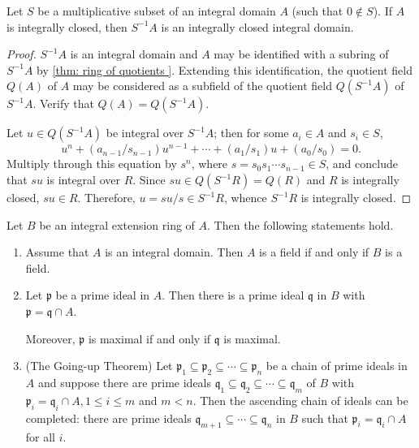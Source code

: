 \documentclass[12pt, oneside]{book}
\begin{document}
\begin{theorem}
    Let $S$ be a multiplicative subset of an integral domain $A$ (such that $0 \notin S$).
    If $A$ is integrally closed, then $S^{-1} A$ is an integrally closed integral domain.
    \begin{proof}
        $S^{-1} A$ is an integral domain and $A$ may be identified with a subring of $S^{-1} A$ by \ref{thm: ring of quotients }.
        Extending this identification, the quotient field $Q(A)$ of $A$ may be considered as a subfield of the quotient field $Q\left(S^{-1} A\right)$ of $S^{-1} A$. Verify that $Q(A)=Q\left(S^{-1} A\right)$.

        Let $u \in Q\left(S^{-1} A\right)$ be integral over $S^{-1} A$; then for some $a_i \in A$ and $s_i \in S$,
        \begin{equation*}
            u^n+\left(a_{n-1} / s_{n-1}\right) u^{n-1}+\cdots+\left(a_1 / s_1\right) u+\left(a_0 / s_0\right)=0 .
        \end{equation*}
        Multiply through this equation by $s^n$, where $s=s_0 s_1 \cdots s_{n-1} \in S$, and conclude that $su$ is integral over $R$. Since $s u \in Q\left(S^{-1} R\right)=Q(R)$ and $R$ is integrally closed, $s u \in R$. Therefore, $u=s u / s \in S^{-1} R$, whence $S^{-1} R$ is integrally closed.
    \end{proof}
\end{theorem}



\begin{theorem}
    Let $B$ be an integral extension ring of $A$. Then the following statements hold.
    \begin{enumerate}
        \item
              Assume that $A$ is an integral domain. Then $A$ is a field if and only if $B$ is a field.
        \item
              Let $\mathfrak{p}$ be a prime ideal in $A$. Then there is a prime ideal $\mathfrak{q}$ in $B$ with $\mathfrak{p}=\mathfrak{q} \cap A$.

              Moreover, $\mathfrak{p}$ is maximal if and only if $\mathfrak{q}$ is maximal.
        \item
              (The Going-up Theorem)
              Let $\mathfrak{p}_1 \subseteq \mathfrak{p}_2 \subseteq \cdots \subseteq \mathfrak{p}_n$ be a chain of prime ideals in $A$ and suppose there are prime ideals $\mathfrak{q}_1 \subseteq \mathfrak{q}_2 \subseteq \cdots \subseteq \mathfrak{q}_m$ of $B$ with $\mathfrak{p}_i=\mathfrak{q}_i \cap A, 1 \leq i \leq m$ and $m<n$. Then the ascending chain of ideals can be completed: there are prime ideals $\mathfrak{q}_{m+1} \subseteq \cdots \subseteq \mathfrak{q}_n$ in $B$ such that $\mathfrak{p}_i=\mathfrak{q}_i \cap A$ for all $i$.
    \end{enumerate}
\end{theorem}
\end{document}
